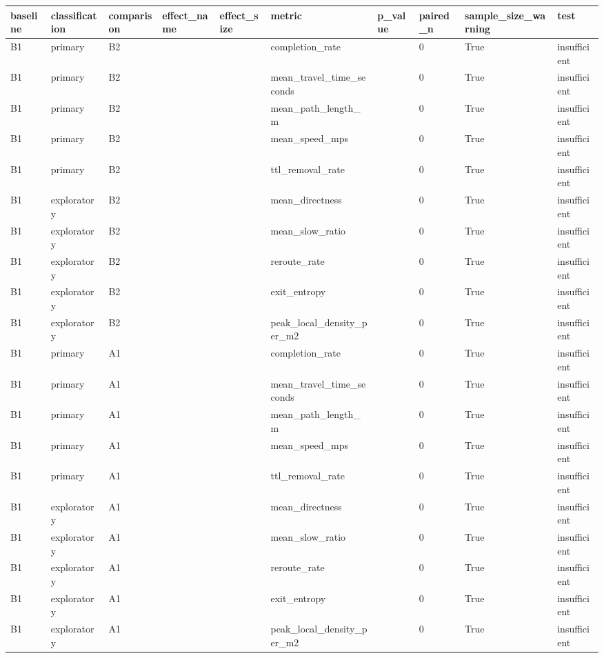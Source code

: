 \begin{tabular}{llllllllll}
\hline
baseline & classification & comparison & effect_name & effect_size & metric & p_value & paired_n & sample_size_warning & test \\
\hline
B1 & primary & B2 &  &  & completion\_rate &  & 0 & True & insufficient \\
B1 & primary & B2 &  &  & mean\_travel\_time\_seconds &  & 0 & True & insufficient \\
B1 & primary & B2 &  &  & mean\_path\_length\_m &  & 0 & True & insufficient \\
B1 & primary & B2 &  &  & mean\_speed\_mps &  & 0 & True & insufficient \\
B1 & primary & B2 &  &  & ttl\_removal\_rate &  & 0 & True & insufficient \\
B1 & exploratory & B2 &  &  & mean\_directness &  & 0 & True & insufficient \\
B1 & exploratory & B2 &  &  & mean\_slow\_ratio &  & 0 & True & insufficient \\
B1 & exploratory & B2 &  &  & reroute\_rate &  & 0 & True & insufficient \\
B1 & exploratory & B2 &  &  & exit\_entropy &  & 0 & True & insufficient \\
B1 & exploratory & B2 &  &  & peak\_local\_density\_per\_m2 &  & 0 & True & insufficient \\
B1 & primary & A1 &  &  & completion\_rate &  & 0 & True & insufficient \\
B1 & primary & A1 &  &  & mean\_travel\_time\_seconds &  & 0 & True & insufficient \\
B1 & primary & A1 &  &  & mean\_path\_length\_m &  & 0 & True & insufficient \\
B1 & primary & A1 &  &  & mean\_speed\_mps &  & 0 & True & insufficient \\
B1 & primary & A1 &  &  & ttl\_removal\_rate &  & 0 & True & insufficient \\
B1 & exploratory & A1 &  &  & mean\_directness &  & 0 & True & insufficient \\
B1 & exploratory & A1 &  &  & mean\_slow\_ratio &  & 0 & True & insufficient \\
B1 & exploratory & A1 &  &  & reroute\_rate &  & 0 & True & insufficient \\
B1 & exploratory & A1 &  &  & exit\_entropy &  & 0 & True & insufficient \\
B1 & exploratory & A1 &  &  & peak\_local\_density\_per\_m2 &  & 0 & True & insufficient \\

\end{tabular}

